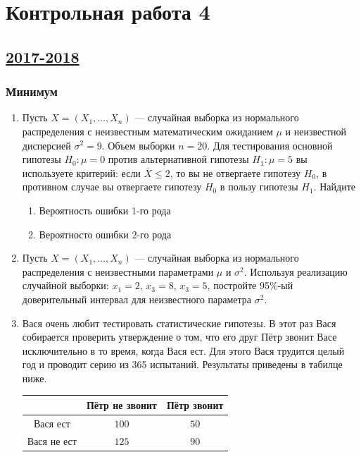 \newpage
\thispagestyle{empty}
\section{Контрольная работа 4}



\subsection[2017-2018]{\hyperref[sec:sol_kr_04_2017_2018]{2017-2018}}
\label{sec:kr_04_2017_2018}


\subsubsection*{Минимум}

\begin{enumerate}


	\item Пусть $X=(X_{1}, \ldots,X_{n})$ — случайная выборка из нормального распределения с неизвестным математическим ожиданием $\mu$ и неизвестной дисперсией $\sigma^2=9$. Объем выборки $n=20$. Для тестирования основной гипотезы $H_{0}:\mu=0$ против альтернативной гипотезы $H_{1}:\mu=5$ вы используете критерий: если $\overline{X}\leq2$, то вы не отвергаете гипотезу $H_{0}$, в противном случае вы отвергаете гипотезу $H_{0}$ в пользу гипотезы $H_{1}$. Найдите
	\begin{enumerate}
	\item Вероятность ошибки 1-го рода
	\item Вероятносто ошибки 2-го рода
	\end{enumerate}


		\item Пусть $X=(X_{1}, \ldots,X_{n})$ — случайная выборка из нормального распределения с неизвестными параметрами $\mu$ и $\sigma^2$. Используя реализацию случайной выборки: $x_{1}=2$, $x_{3}=8$, $x_{3}=5$, постройте 95\%-ый доверительный интервал для неизвестного параметра $\sigma^2$.


	\item Вася очень любит тестировать статистические гипотезы. В этот раз Вася собирается проверить утверждение о том, что его друг Пётр звонит Васе исключительно в то время, когда Вася ест. Для этого Вася трудится целый год и проводит серию из 365 испытаний. Результаты приведены в табилце ниже.

	\begin{center}
		\begin{tabular}{c|cc}
			\toprule
			& Пётр не звонит & Пётр звонит\\
			\midrule
			Вася ест & $100$ & $50$\\
			Вася не ест  & $125$ & $90$\\
			\bottomrule
		\end{tabular}
	\end{center}


\end{enumerate}

